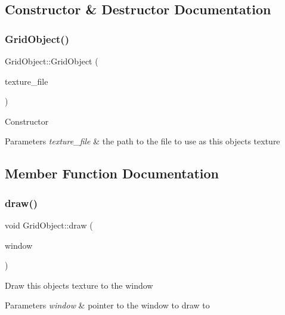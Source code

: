 \subsection{Constructor \& Destructor Documentation}
\mbox{\label{classGridObject_a3387d27277ec570e1055cdd7e14112bd}} 
\subsubsection{\texorpdfstring{Grid\+Object()}{GridObject()}}
{\footnotesize\ttfamily Grid\+Object\+::\+Grid\+Object (\begin{DoxyParamCaption}\item[{std\+::string}]{texture\+\_\+file }\end{DoxyParamCaption})}

Constructor


\begin{DoxyParams}{Parameters}
{\em texture\+\_\+file} & the path to the file to use as this objects texture \\
\hline
\end{DoxyParams}


\subsection{Member Function Documentation}
\mbox{\label{classGridObject_aa0e4a56710d84ca4e9e33dd32c845385}} 
\subsubsection{\texorpdfstring{draw()}{draw()}\hspace{0.1cm}{\footnotesize\ttfamily [1/2]}}
{\footnotesize\ttfamily void Grid\+Object\+::draw (\begin{DoxyParamCaption}\item[{sf\+::\+Render\+Window \&}]{window }\end{DoxyParamCaption})}

Draw this objects texture to the window


\begin{DoxyParams}{Parameters}
{\em window} & pointer to the window to draw to \\
\hline
\end{DoxyParams}
\mbox{\label{classGridObject_acc5d81353ace804015204eba4782a827}} 
